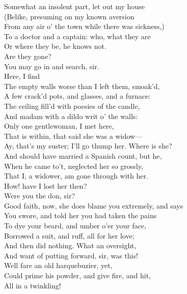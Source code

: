 \documentclass[a4paper,oneside]{memoir}
\begin{document}
\begin{drama*}
Somewhat an insolent part, let out my house\\
(Belike, presuming on my known aversion\\
From any air o' the town while there was sickness,)\\
To a doctor and a captain: who, what they are\\
Or where they be, he knows not.\\
\mammonspeaks {} Are they gone?\\
\lovewitspeaks You may go in and search, sir.\\
Here, I find\\
The empty walls worse than I left them, smoak'd,\\
A few crack'd pots, and glasses, and a furnace:\\
The ceiling fill'd with poesies of the candle,\\
And madam with a dildo writ o' the walls:\\
Only one gentlewoman, I met here,\\
That is within, that said she was a widow---\\
\kastrilspeaks Ay, that's my suster; I'll go thump her. Where is she?\\
\lovewitspeaks And should have married a Spanish count, but he,\\
When he came to't, neglected her so grossly,\\
That I, a widower, am gone through with her.\\
\surlyspeaks How! have I lost her then?\\
\lovewitspeaks {} Were you the don, sir?\\
Good faith, now, she does blame you extremely, and says\\
You swore, and told her you had taken the pains\\
To dye your beard, and umber o'er your face,\\
Borrowed a suit, and ruff, all for her love;\\
And then did nothing. What an oversight,\\
And want of putting forward, sir, was this!\\
Well fare an old harquebuzier, yet,\\
Could prime his powder, and give fire, and hit,\\
All in a twinkling!\\

\end{drama*}
\end{document}
